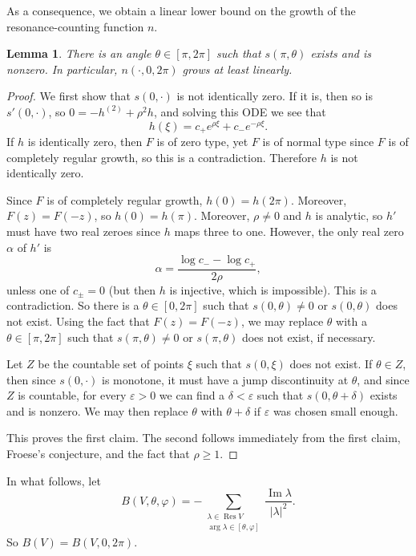 \documentclass[12pt]{report}
\DeclareMathOperator{\Res}{Res}
\renewcommand{\Im}{\operatorname{Im}}
\newtheorem{lemma}[theorem]{Lemma}
\theoremstyle{definition}
\begin{document}
As a consequence, we obtain a linear lower bound on the growth of the resonance-counting function $n$.
\begin{lemma}
\label{linear lower bound on resonances}
There is an angle $\theta \in [\pi, 2\pi]$ such that $s(\pi, \theta)$ exists and is nonzero. In particular, $n(\cdot, 0, 2\pi)$ grows at least linearly.
\end{lemma}
\begin{proof}
We first show that $s(0, \cdot)$ is not identically zero. If it is, then so is $s'(0, \cdot)$, so $0 = -h^{(2)} + \rho^2 h$,
and solving this ODE we see that
$$h(\xi) = c_+e^{\rho\xi} + c_-e^{-\rho\xi}.$$
If $h$ is identically zero, then $F$ is of zero type, yet $F$ is of normal type since $F$ is of completely regular growth, so this is a contradiction. Therefore $h$ is not identically zero.

Since $F$ is of completely regular growth, $h(0) = h(2\pi)$. Moreover, $F(z) = F(-z)$, so $h(0) = h(\pi)$. Moreover, $\rho \neq 0$ and $h$ is analytic, so $h'$ must have two real zeroes since $h$ maps three to one. However, the only real zero $\alpha$ of $h'$ is
$$\alpha = \frac{\log c_- - \log c_+}{2\rho},$$
unless one of $c_\pm = 0$ (but then $h$ is injective, which is impossible).
This is a contradiction. So there is a $\theta \in [0, 2\pi]$ such that $s(0, \theta) \neq 0$ or $s(0, \theta)$ does not exist. Using the fact that $F(z) = F(-z)$, we may replace $\theta$ with a $\theta \in [\pi, 2\pi]$ such that $s(\pi, \theta) \neq 0$ or $s(\pi, \theta)$ does not exist, if necessary.

Let $Z$ be the countable set of points $\xi$ such that $s(0, \xi)$ does not exist. If $\theta \in Z$, then since $s(0, \cdot)$ is monotone, it must have a jump discontinuity at $\theta$, and since $Z$ is countable, for every $\varepsilon > 0$ we can find a $\delta < \varepsilon$ such that $s(0, \theta + \delta)$ exists and is nonzero. We may then replace $\theta$ with $\theta + \delta$ if $\varepsilon$ was chosen small enough.

This proves the first claim. The second follows immediately from the first claim, Froese's conjecture, and the fact that $\rho \geq 1$.
\end{proof}

In what follows, let
$$B(V, \theta, \varphi) = -\sum_{\substack{\lambda \in \Res V\\\arg \lambda \in [\theta, \varphi]}} \frac{\Im \lambda}{|\lambda|^2}.$$
So $B(V) = B(V, 0, 2\pi)$.
\end{document}
